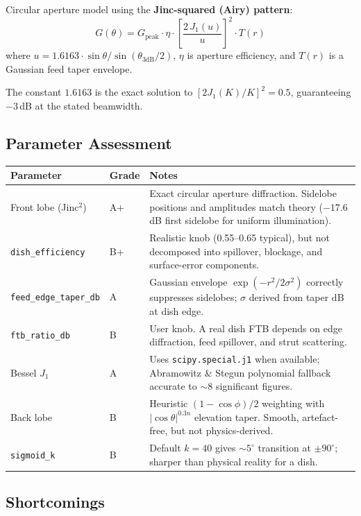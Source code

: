 \documentclass[11pt,a4paper]{article}
\begin{document}
Circular aperture model using the \textbf{Jinc-squared (Airy) pattern}:
\[
G(\theta) = G_\text{peak} \cdot \eta \cdot
    \left[\frac{2\,J_1(u)}{u}\right]^{2} \cdot T(r)
\]
where $u = 1.6163 \cdot \sin\theta / \sin(\theta_{3\text{dB}}/2)$,
$\eta$ is aperture efficiency, and $T(r)$ is a Gaussian feed taper envelope.

The constant $1.6163$ is the exact solution to $[2J_1(K)/K]^2 = 0.5$,
guaranteeing $-3$\,dB at the stated beamwidth.

\subsection{Parameter Assessment}

\begin{longtable}{@{}llp{6cm}@{}}
\toprule
\textbf{Parameter} & \textbf{Grade} & \textbf{Notes} \\
\midrule
\endhead
Front lobe (Jinc$^2$) & A+ & Exact circular aperture diffraction. Sidelobe positions and amplitudes match theory ($-17.6$\,dB first sidelobe for uniform illumination). \\
\texttt{dish\_efficiency} & B+ & Realistic knob (0.55--0.65 typical), but not decomposed into spillover, blockage, and surface-error components. \\
\texttt{feed\_edge\_taper\_db} & A & Gaussian envelope $\exp(-r^2/2\sigma^2)$ correctly suppresses sidelobes; $\sigma$ derived from taper dB at dish edge. \\
\texttt{ftb\_ratio\_db} & B & User knob. A real dish FTB depends on edge diffraction, feed spillover, and strut scattering. \\
Bessel $J_1$ & A & Uses \texttt{scipy.special.j1} when available; Abramowitz \& Stegun polynomial fallback accurate to $\sim 8$ significant figures. \\
Back lobe & B & Heuristic $(1 - \cos\phi)/2$ weighting with $|\cos\theta|^{0.3n}$ elevation taper. Smooth, artefact-free, but not physics-derived. \\
\texttt{sigmoid\_k} & B & Default $k = 40$ gives $\sim\!5^\circ$ transition at $\pm 90^\circ$; sharper than physical reality for a dish. \\
\bottomrule
\end{longtable}

\subsection{Shortcomings}
\end{document}
